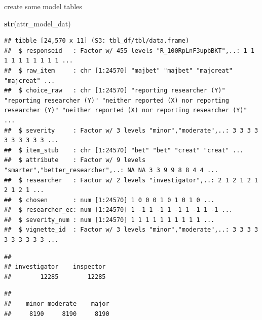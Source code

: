\documentclass[
]{article}
\newenvironment{Shaded}{\begin{snugshade}}{\end{snugshade}}
\newcommand{\FunctionTok}[1]{\textcolor[rgb]{0.13,0.29,0.53}{\textbf{#1}}}
\newcommand{\NormalTok}[1]{#1}
\newcommand{\SpecialCharTok}[1]{\textcolor[rgb]{0.81,0.36,0.00}{\textbf{#1}}}
\begin{document}
create some model tables

\begin{Shaded}
\begin{Highlighting}[]
\FunctionTok{str}\NormalTok{(attr\_model\_dat)}
\end{Highlighting}
\end{Shaded}

\begin{verbatim}
## tibble [24,570 x 11] (S3: tbl_df/tbl/data.frame)
##  $ responseid   : Factor w/ 455 levels "R_100RpLnF3upbBKT",..: 1 1 1 1 1 1 1 1 1 1 ...
##  $ raw_item     : chr [1:24570] "majbet" "majbet" "majcreat" "majcreat" ...
##  $ choice_raw   : chr [1:24570] "reporting researcher (Y)" "reporting researcher (Y)" "neither reported (X) nor reporting researcher (Y)" "neither reported (X) nor reporting researcher (Y)" ...
##  $ severity     : Factor w/ 3 levels "minor","moderate",..: 3 3 3 3 3 3 3 3 3 3 ...
##  $ item_stub    : chr [1:24570] "bet" "bet" "creat" "creat" ...
##  $ attribute    : Factor w/ 9 levels "smarter","better_researcher",..: NA NA 3 3 9 9 8 8 4 4 ...
##  $ researcher   : Factor w/ 2 levels "investigator",..: 2 1 2 1 2 1 2 1 2 1 ...
##  $ chosen       : num [1:24570] 1 0 0 0 1 0 1 0 1 0 ...
##  $ researcher_ec: num [1:24570] 1 -1 1 -1 1 -1 1 -1 1 -1 ...
##  $ severity_num : num [1:24570] 1 1 1 1 1 1 1 1 1 1 ...
##  $ vignette_id  : Factor w/ 3 levels "minor","moderate",..: 3 3 3 3 3 3 3 3 3 3 ...
\end{verbatim}

\begin{Shaded}
\end{Shaded}

\begin{verbatim}
## 
## investigator    inspector 
##        12285        12285
\end{verbatim}

\begin{Shaded}
\end{Shaded}

\begin{verbatim}
## 
##    minor moderate    major 
##     8190     8190     8190
\end{verbatim}
\end{document}
